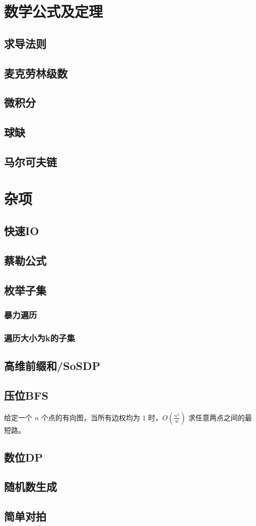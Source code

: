 \documentclass{article}
\begin{document}
\section{数学公式及定理}
\subsection{求导法则}
\subsection{麦克劳林级数}
\subsection{微积分}
\subsection{球缺}
\subsection{马尔可夫链}

\section{杂项}
\subsection{快速IO}

\subsection{蔡勒公式}

\subsection{枚举子集}
\subsubsection{暴力遍历}

\subsubsection{遍历大小为k的子集}

\subsection{高维前缀和/SoSDP}

\subsection{压位BFS}
给定一个 $n$ 个点的有向图，当所有边权均为 $1$ 时，$O(\frac{n^3}{w})$ 求任意两点之间的最短路。

\subsection{数位DP}

\subsection{随机数生成}

\subsection{简单对拍}

\end{document}

